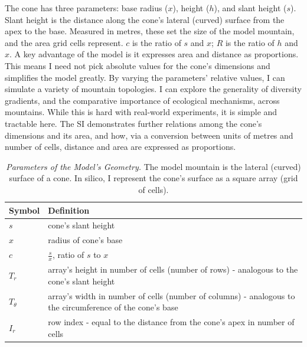 \documentclass[11pt]{article}
\begin{document}
The cone has three parameters: base radius ($x$), height ($h$), and slant height ($s$). Slant height is the distance along the cone's lateral (curved) surface from the apex to the base. Measured in metres, these set the size of the model mountain, and the area grid cells represent. $c$ is the ratio of $s$ and $x$; $R$ is the ratio of $h$ and $x$. A key advantage of the model is it expresses area and distance as proportions. This means I need not pick absolute values for the cone's dimensions and simplifies the model greatly. By varying the parameters' relative values, I can simulate a variety of mountain topologies. I can explore the generality of diversity gradients, and the comparative importance of ecological mechanisms, across mountains. While this is hard with real-world experiments, it is simple and tractable here. The SI demonstrates further relations among the cone's dimensions and its area, and how, via a conversion between units of metres and number of cells, distance and area are expressed as proportions.

\begin{table}[!hbtp]
\centering
\begin{tabular}{ | m{2cm} | m{10cm} | } 
	\hline
	\textbf{Symbol} & \textbf{Definition} \\
	\hline
	$s$ & cone's slant height \\
	\hline
	$x$ & radius of cone's base \\
	\hline
	$c$ & $\frac{s}{x}$, ratio of $s$ to $x$ \\
	\hline
	$T_r$ & array's height in number of cells (number of rows) - analogous to the cone's slant height \\
	\hline
	$T_\theta$ & array's width in number of cells (number of columns) - analogous to the circumference of the cone's base \\
	\hline
	$I_r$ & row index - equal to the distance from the cone's apex in number of cells \\
	\hline
\end{tabular}
\caption{\emph{Parameters of the Model's Geometry.} The model mountain is the lateral (curved) surface of a cone. In silico, I represent the cone's surface as a square array (grid of cells).}
\end{table}
\end{document}
